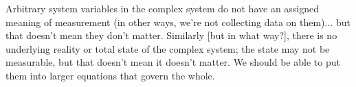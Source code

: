\documentclass{sig-alternate-05-2015}
\theoremstyle{plain}
\theoremstyle{plain}
\theoremstyle{remark}
\begin{document}
Arbitrary system variables in the complex system do not have an assigned meaning of measurement (in other ways, we're not collecting data on them)... but that doesn't mean they don't matter. Similarly [but in what way?], there is no underlying reality or total state of the complex system; the state may not be measurable, but that doesn't mean it doesn't matter. We should be able to put them into larger equations that govern the whole.



 
\end{document}
